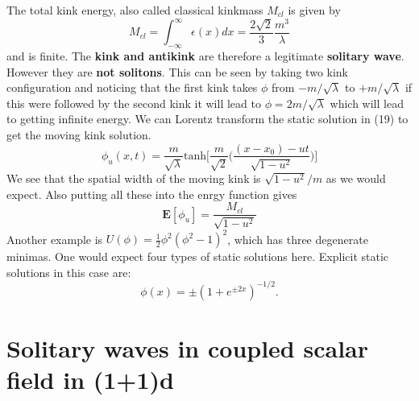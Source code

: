\documentclass[a4paper, 12pt]{article}
\begin{document}
 The total kink energy, also called classical kinkmass $M_{cl}$ is given by
  \begin{equation}%
M_{cl} = \int_{-\infty}^{\infty} \epsilon (x) dx = \frac{2\sqrt{2}}{3}\frac{m^3}{\lambda}
 \end{equation}
 and is finite. The \textbf{kink and antikink} are therefore a legitimate \textbf{solitary wave}. However they are \textbf{not solitons}. This can be seen by taking two kink configuration and noticing that the first kink takes $\phi$ from $-m/\sqrt{\lambda}$ to $+m/\sqrt{\lambda}$ if this were followed by the second kink it will lead to $\phi = 2m/\sqrt{\lambda}$ which will lead to getting infinite energy.
 We can Lorentz transform the static solution in (19) to get the moving kink solution. 
 \begin{equation}%
 \phi_u (x,t) =  \frac{m}{\sqrt{\lambda}} \textrm{tanh}\bigg[\frac{m}{\sqrt{2}}\bigg(\frac{(x - x_0)-ut}{\sqrt{1-u^2}}\bigg)\bigg]
 \end{equation}
 We see that the spatial width of the moving kink is $\sqrt{1-u^2}/m$ as we would expect. Also putting all these into the enrgy function gives
   \begin{equation}%
\bm E[\phi_u]=\frac{M_{cl}}{\sqrt{1-u^2}}
 \end{equation}
 Another example is $U(\phi) = \frac{1}{2}\phi^2 (\phi^2 -1)^2$, which has three degenerate minimas. One would expect four types of static solutions here. Explicit static solutions in this case are:
 \begin{equation}
 \phi (x) = \pm (1+e^{\pm 2x})^{-1/2}.
 \end{equation}

 \section {Solitary waves in coupled scalar field in (1+1)d} 
 
\end{document}
